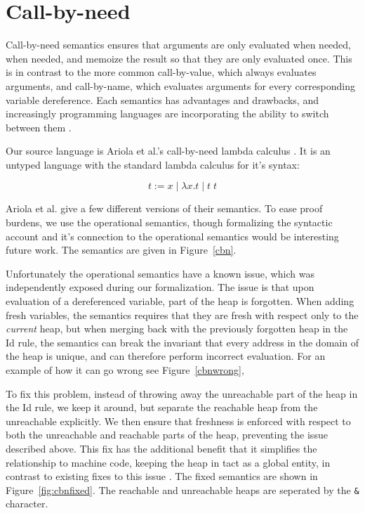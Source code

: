 \section{Call-by-need}

Call-by-need semantics ensures that arguments are only evaluated when needed,
when needed, and memoize the result so that they are only evaluated once. This
is in contrast to the more common call-by-value, which always evaluates
arguments, and call-by-name, which evaluates arguments for every corresponding
variable dereference. Each semantics has advantages and drawbacks, and
increasingly programming languages are incorporating the ability to switch
between them \cite{?}. 

Our source language is Ariola et al.'s call-by-need lambda calculus \cite{?}. It
is an untyped language with the standard lambda calculus for it's syntax: 

  $$ t := x \; | \; \lambda x . t \; | \; t \; t $$

Ariola et al. give a few different versions of their semantics. To ease 
proof burdens, we use the operational semantics, though formalizing the
syntactic account and it's connection to the operational semantics would be
interesting future work. The semantics are given in Figure~\ref{cbn}. 

Unfortunately the operational semantics have a known issue, which was
independently exposed during our formalization. The issue is that upon
evaluation of a dereferenced variable, part of the heap is forgotten. When
adding fresh variables, the semantics requires that they are fresh with respect
only to the \emph{current} heap, but when merging back with the previously
forgotten heap in the Id rule, the semantics can break the invariant that every
address in the domain of the heap is unique, and can therefore perform incorrect
evaluation. For an example of how it can go wrong see Figure~\ref{cbnwrong}, 

To fix this problem, instead of throwing away the unreachable part of the heap
in the Id rule, we keep it around, but separate the reachable heap from the
unreachable explicitly. We then ensure that freshness is enforced with respect
to both the unreachable and reachable parts of the heap, preventing the issue
described above. This fix has the additional benefit that it simplifies the
relationship to machine code, keeping the heap in tact as a global entity, in
contrast to existing fixes to this issue \cite{?}. The fixed semantics are shown
in Figure~\ref{fig:cbnfixed}. The reachable and unreachable heaps are seperated by
the \texttt{\&} character.

